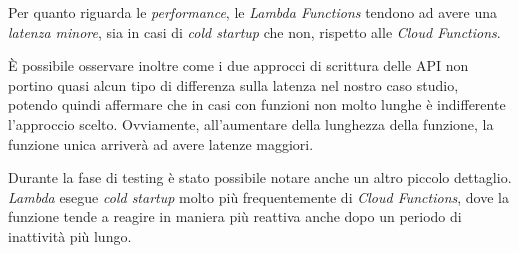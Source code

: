 Per quanto riguarda le \textit{performance}, le \textit{Lambda Functions} tendono ad avere una \textit{latenza minore}, sia in casi di \textit{cold startup} che non, rispetto alle \textit{Cloud Functions}.

È possibile osservare inoltre come i due approcci di scrittura delle API non portino quasi alcun tipo di differenza sulla latenza nel nostro caso studio, potendo quindi affermare che in casi con funzioni non molto lunghe è indifferente l'approccio scelto. Ovviamente, all'aumentare della lunghezza della funzione, la funzione unica arriverà ad avere latenze maggiori.

Durante la fase di testing è stato possibile notare anche un altro piccolo dettaglio. \textit{Lambda} esegue \textit{cold startup} molto più frequentemente di \textit{Cloud Functions}, dove la funzione tende a reagire in maniera più reattiva anche dopo un periodo di inattività più lungo.